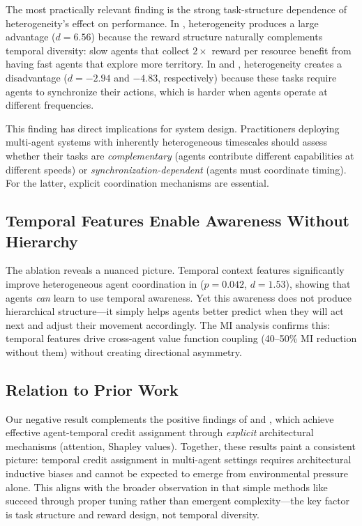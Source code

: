 The most practically relevant finding is the strong task-structure dependence of heterogeneity's effect on performance. In \foraging, heterogeneity produces a large advantage ($d = 6.56$) because the reward structure naturally complements temporal diversity: slow agents that collect $2\times$ reward per resource benefit from having fast agents that explore more territory. In \relay and \rendezvous, heterogeneity creates a disadvantage ($d = -2.94$ and $-4.83$, respectively) because these tasks require agents to synchronize their actions, which is harder when agents operate at different frequencies.

This finding has direct implications for system design. Practitioners deploying multi-agent systems with inherently heterogeneous timescales should assess whether their tasks are \emph{complementary} (agents contribute different capabilities at different speeds) or \emph{synchronization-dependent} (agents must coordinate timing). For the latter, explicit coordination mechanisms are essential.

\subsection{Temporal Features Enable Awareness Without Hierarchy}

The ablation reveals a nuanced picture. Temporal context features significantly improve heterogeneous agent coordination in \rendezvous ($p = 0.042$, $d = 1.53$), showing that agents \emph{can} learn to use temporal awareness. Yet this awareness does not produce hierarchical structure---it simply helps agents better predict when they will act next and adjust their movement accordingly. The MI analysis confirms this: temporal features drive cross-agent value function coupling (40--50\% MI reduction without them) without creating directional asymmetry.

\subsection{Relation to Prior Work}

Our negative result complements the positive findings of \tartwo \citep{kapoor2024tar2} and \stas \citep{chen2024stas}, which achieve effective agent-temporal credit assignment through \emph{explicit} architectural mechanisms (attention, Shapley values). Together, these results paint a consistent picture: temporal credit assignment in multi-agent settings requires architectural inductive biases and cannot be expected to emerge from environmental pressure alone. This aligns with the broader observation in \marl that simple methods like \mappo \citep{yu2022mappo} succeed through proper tuning rather than emergent complexity---the key factor is task structure and reward design, not temporal diversity.

